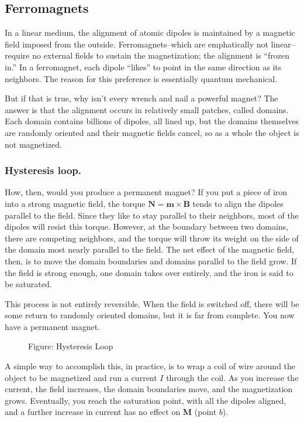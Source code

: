 \documentclass[../../../main.tex]{subfiles}
\begin{document}
\subsection{Ferromagnets}
In a linear medium, the alignment of atomic dipoles is maintained by a magnetic ﬁeld imposed from the outside. Ferromagnets--which are emphatically not linear--require no external ﬁelds to sustain the magnetization; the alignment is “frozen in.” In a ferromagnet, each dipole “likes” to point in the same direction as its neighbors. The reason for this preference is essentially quantum mechanical. 

But if that is true, why isn’t every wrench and nail a powerful magnet? The answer is that the alignment occurs in relatively small patches, called domains. Each domain contains billions of dipoles, all lined up, but the domains themselves are randomly oriented and their magnetic ﬁelds cancel, so as a whole the object is not magnetized.

\subsubsection{Hysteresis loop.} How, then, would you produce a permanent magnet? If you put a piece of iron into a strong magnetic ﬁeld, the torque $\mathbf{N} = \mathbf{m} \times \mathbf{B}$ tends to align the dipoles parallel to the ﬁeld. Since they like to stay parallel to their neighbors, most of the dipoles will resist this torque. However, at the boundary between two domains, there are competing neighbors, and the torque will throw its weight on the side of the domain most nearly parallel to the ﬁeld. The net effect of the magnetic ﬁeld, then, is to move the domain boundaries and domains parallel to the ﬁeld grow. If the ﬁeld is strong enough, one domain takes over entirely, and the iron is said to be saturated.

This process is not entirely reversible. When the ﬁeld is switched off, there will be some return to randomly oriented domains, but it is far from complete. You now have a permanent magnet.

\begin{figure*}
    \centering
    \caption*{Figure: Hysteresis Loop}
\end{figure*}

A simple way to accomplish this, in practice, is to wrap a coil of wire around the object to be magnetized and run a current $I$ through the coil. As you increase the current, the ﬁeld increases, the domain boundaries move, and the magnetization grows. Eventually, you reach the saturation point, with all the dipoles aligned, and a further increase in current has no effect on \textbf{M} (point $b$).
\end{document}
